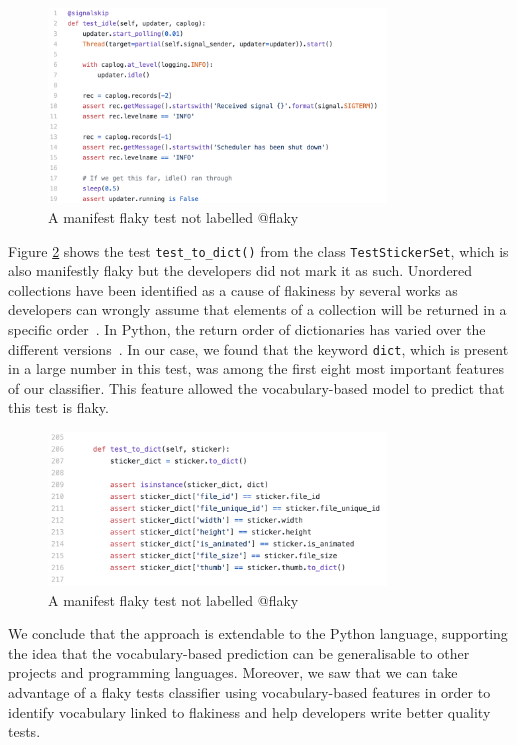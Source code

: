 \begin{figure}[ht]
\centering
\includegraphics[width=0.8\textwidth]{figures/replication/manifestFlakyExample.png}
\caption{A manifest flaky test not labelled @flaky}
\label{manifest-flaky-example}
\end{figure}

Figure \ref{manifest-flaky-example2} shows the test \texttt{test\_to\_dict()} from the class \texttt{TestStickerSet}, which is also manifestly flaky but the developers did not mark it as such. 
Unordered collections have been identified as a cause of flakiness by several works as developers can wrongly assume that elements of a collection will be returned in a specific order~\cite{Luo2014,Dutta2020}.
In Python, the return order of dictionaries has varied over the different versions~\cite{PythonDoc, unorderedCollectionsStackOverflow}. In our case, we found that the keyword \texttt{dict}, which is present in a large number in this test, was among the first eight most important features of our classifier.
This feature allowed the vocabulary-based model to predict that this test is flaky.

\begin{figure}[ht]
\centering
\includegraphics[width=0.8\textwidth]{figures/replication/manifestFlakyExample2.png}
\caption{A manifest flaky test not labelled @flaky}
\label{manifest-flaky-example2}
\end{figure}

We conclude that the approach is extendable to the Python language, supporting the idea that the vocabulary-based prediction can be generalisable to other projects and programming languages. Moreover, we saw that we can take advantage of a flaky tests classifier using vocabulary-based features in order to identify vocabulary linked to flakiness and help developers write better quality tests.\\

